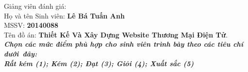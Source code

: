 \thispagestyle{plain}
\begin{center}
\Large{}
\end{center}
Giảng viên đánh giá: \dotline[4pt]{12cm}\\
Họ và tên Sinh viên:\hspace{3.33cm} \textbf{Lê Bá Tuấn Anh}\\
MSSV:\hspace{6.7cm} \textbf{20140088}\\
Tên đồ án:     \textbf {Thiết Kế Và Xây Dựng Website Thương Mại Điện Tử}.\\
\emph{\textbf{Chọn các mức điểm phù hợp cho sinh viên trình bày theo các tiêu chí dưới~đây:\\
Rất kém (1); Kém (2); Đạt (3); Giỏi (4); Xuất sắc (5)}} \\
